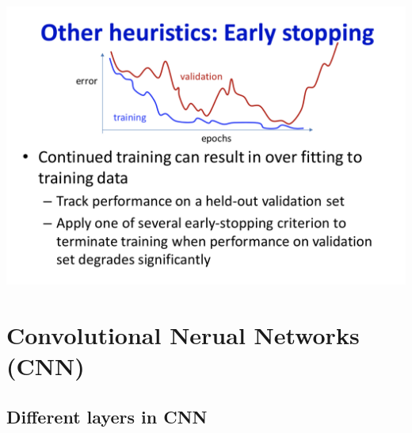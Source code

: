 \documentclass{article}
\begin{document}
	\includegraphics[scale=0.2]{110.png}
	
	\section{Convolutional Nerual Networks (CNN)}
	\subsection{Different layers in CNN}
\end{document}
